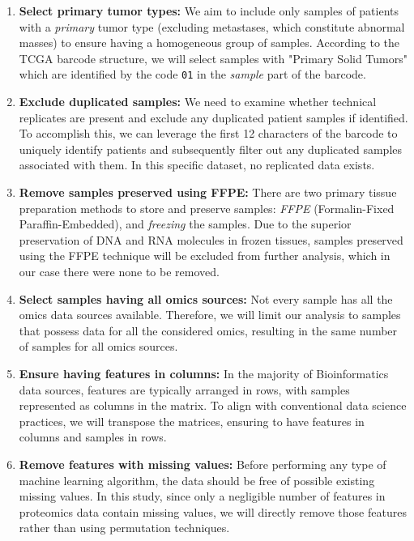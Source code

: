 \begin{enumerate}[\IEEEsetlabelwidth{12)}]
    \item \textbf{Select primary tumor types:} We aim to include only samples of patients with a \textit{primary} tumor type (excluding metastases, which constitute abnormal masses) to ensure having a homogeneous group of samples. According to the TCGA barcode structure, we will select samples with "Primary Solid Tumors" which are identified by the code \verb|01| in the \textit{sample} part of the barcode.
    
    \item \textbf{Exclude duplicated samples:} We need to examine whether technical replicates are present and exclude any duplicated patient samples if identified. To accomplish this, we can leverage the first 12 characters of the barcode to uniquely identify patients and subsequently filter out any duplicated samples associated with them. In this specific dataset, no replicated data exists.
    
    \item \textbf{Remove samples preserved using FFPE:} There are two primary tissue preparation methods to store and preserve samples: \textit{FFPE} (Formalin-Fixed Paraffin-Embedded), and \textit{freezing} the samples. Due to the superior preservation of DNA and RNA molecules in frozen tissues, samples preserved using the FFPE technique will be excluded from further analysis, which in our case there were none to be removed.
    
    \item \textbf{Select samples having all omics sources:} Not every sample has all the omics data sources available. Therefore, we will limit our analysis to samples that possess data for all the considered omics, resulting in the same number of samples for all omics sources.
    
    \item \textbf{Ensure having features in columns:} In the majority of Bioinformatics data sources, features are typically arranged in rows, with samples represented as columns in the matrix. To align with conventional data science practices, we will transpose the matrices, ensuring to have features in columns and samples in rows.
    
    \item \textbf{Remove features with missing values:} Before performing any type of machine learning algorithm, the data should be free of possible existing missing values. In this study, since only a negligible number of features in proteomics data contain missing values, we will directly remove those features rather than using permutation techniques.
    

\end{enumerate}
